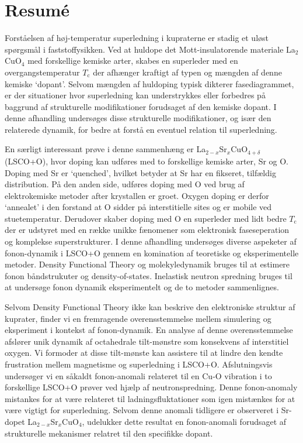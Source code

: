 \chapter*{Resum\'e}
Forståelsen af høj-temperatur superledning i kupraterne er stadig et uløst spørgsmål i faststoffysikken. Ved at huldope det Mott-insulatorende materiale La$_2$CuO$_4$ med forskellige kemiske arter, skabes en superleder med en overgangstemperatur $T_\text{c}$ der afhænger kraftigt af typen og mængden af denne kemiske `dopant'. Selvom mængden af huldoping typisk dikterer fasediagrammet, er der situationer hvor superledning kan understrykkes eller forbedres på baggrund af strukturelle modifikationer forudsaget af den kemiske dopant. I denne afhandling undersøges disse strukturelle modifikationer, og især den relaterede dynamik, for bedre at forstå en eventuel relation til superledning.

En særligt interessant prøve i denne sammenhæng er La$_{2-x}$Sr$_x$CuO$_{4+\delta}$ (LSCO+O), hvor doping kan udføres med to forskellige kemiske arter, Sr og O. Doping med Sr er `quenched', hvilket betyder at Sr har en fikseret, tilfældig distribution. På den anden side, udføres doping med O ved brug af elektrokemiske metoder after krystallen er groet. Oxygen doping er derfor `annealet' i den forstand at O sidder på interstitielle sites og er mobile ved stuetemperatur. Derudover skaber doping med O en superleder med lidt bedre $T_\text{c}$ der er udstyret med en række unikke fænomener som elektronisk faseseperation og komplekse superstrukturer. I denne afhandling undersøges diverse aspeketer af fonon-dynamik i LSCO+O gennem en komination af teoretiske og eksperimentelle metoder. Density Functional Theory og molekyledynamik bruges til at estimere fonon båndstrukuter og density-of-states. Inelastisk neutron spredning bruges til at undersøge fonon dynamik eksperimentelt og de to metoder sammenlignes.

Selvom Density Functional Theory ikke kan beskrive den elektroniske struktur af kuprater, finder vi en fremragende overensstemmelse mellem simulering og eksperiment i kontekst af fonon-dynamik. En analyse af denne overensstemmelse afslører unik dynamik af octahedrale tilt-mønstre som konsekvens af interstitiel oxygen. Vi formoder at disse tilt-mønste kan assistere til at lindre den kendte frustration mellem magnetisme og superledning i LSCO+O. Afslutningsvis undersøger vi en såkaldt fonon-anomali relateret til en Cu-O vibration i to forskellige LSCO+O prøver ved hjælp af neutronspredning. Denne fonon-anomaly mistankes for at være relateret til ladningsfluktationer som igen mistænkes for at være vigtigt for superledning. Selvom denne anomali tidligere er observeret i Sr-dopet La$_{2-x}$Sr$_x$CuO$_4$, udelukker dette resultat en fonon-anomali forudsaget af strukturelle mekanismer relatret til den specifikke dopant.
